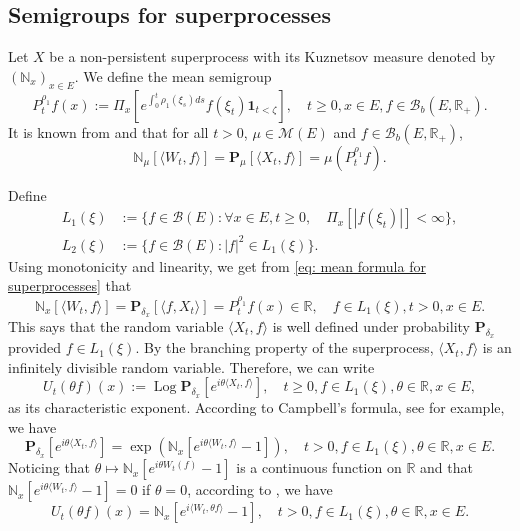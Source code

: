 \documentclass[12pt,a4paper]{amsart}
\theoremstyle{plain}
\theoremstyle{definition}
\numberwithin{equation}{section}
\begin{document}
\subsection{Semigroups for superprocesses}
\label{sec: definition of vf}
Let $X$ be a non-persistent superprocess with its Kuznetsov measure denoted by $(\mathbb N_x)_{x\in E}$.
We define the mean semigroup
\begin{equation}
  P_t^{\rho_1} f(x)
  := \Pi_{x}[e^{\int_0^t \rho_1(\xi_s)ds}f(\xi_t) \mathbf 1_{t< \zeta}],
  \quad t\geq 0, x\in E, f\in \mathcal B_b(E,\mathbb R_+).
\end{equation}
It is known from \cite[Proposition 2.27]{Li2011Measure-valued} and \cite[Theorem 2.7]{Kyprianou2014Fluctuations} that for all $t > 0$, $\mu \in \mathcal M(E)$ and $f\in \mathcal B_b(E,\mathbb R_+)$,
\begin{equation}
  \label{eq: mean formula for superprocesses}
  \mathbb N_{\mu}[\langle W_t, f\rangle]
  =\mathbf P_{\mu}[\langle X_t, f\rangle]
  =\mu(P^{\rho_1}_t f).
\end{equation}

Define
\begin{align}
  L_1(\xi)
  &:= \{f\in \mathcal B(E): \forall x\in E, t\geq 0, \quad \Pi_x[|f(\xi_t)|]< \infty\}, \\
  L_2(\xi)
  &:= \{f \in \mathcal B(E): |f|^2 \in L_1(\xi)\}.
\end{align}
Using monotonicity and linearity, we get from \eqref{eq: mean formula for superprocesses}  that
\begin{equation}
  \mathbb N_x[\langle W_t, f\rangle]
  = \mathbf P_{\delta_x}[\langle f, X_t\rangle]
  = P^{\rho_1}_t f(x) \in \mathbb R,
  \quad f\in L_1(\xi), t > 0,x\in E.
\end{equation}
This says that the random variable $\langle X_t, f\rangle$ is well defined under probability $\mathbf P_{\delta_x}$ provided $f\in L_1(\xi)$.
By the branching property of the superprocess, $\langle X_t, f\rangle$ is an infinitely divisible random variable.
Therefore, we can write
\[
  U_t(\theta f)(x) 
  := \operatorname{Log} \mathbf P_{\delta_x}[e^{i \theta \langle X_t, f\rangle}],
  \quad t\geq 0, f\in L_1(\xi), \theta \in \mathbb R, x\in E,
\]
as its characteristic exponent.
According to Campbell's formula, see \cite[Theorem 2.7]{Kyprianou2014Fluctuations} for example, we have
\[
  \mathbf P_{\delta_x} [e^{i\theta \langle X_t, f\rangle}]
  = \exp(\mathbb N_x[ e^{i\theta \langle W_t, f\rangle} - 1]),
  \quad t>0, f\in L_1(\xi), \theta \in \mathbb R, x\in E.
\]
Noticing that $\theta \mapsto \mathbb N_x[e^{i\theta W_t(f)} - 1]$ is a continuous function on $\mathbb R$ and that $\mathbb N_x[e^{i\theta \langle W_t, f\rangle} - 1] = 0$ if $\theta = 0$, according to \cite[Lemma 7.6]{Sato2013Levy}, we have
\begin{equation}
  \label{eq: N and characteristic exponent}
  U_t(\theta f)(x) 
  = \mathbb N_x[e^{i \langle W_t, \theta f\rangle} - 1],
  \quad t>0, f\in L_1(\xi), \theta \in \mathbb R, x\in E.
\end{equation}
\end{document}
